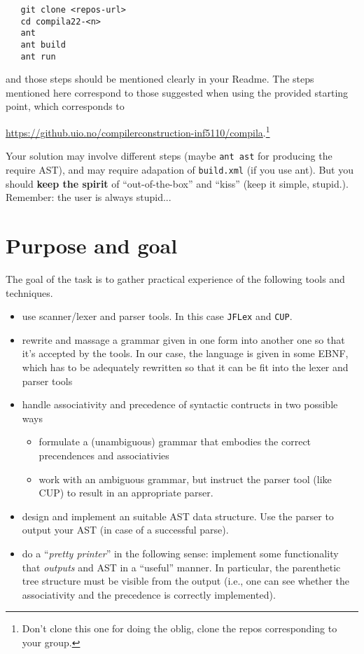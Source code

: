 \documentclass[10pt,freeform]{handout}[2014/08/13]
\begin{document}
\begin{verbatim}
   git clone <repos-url>
   cd compila22-<n>
   ant
   ant build
   ant run
\end{verbatim}
and those steps should be mentioned clearly in your Readme. The steps
mentioned here correspond to those suggested when using the provided
starting point, which corresponds to
\begin{center}
  \url{https://github.uio.no/compilerconstruction-inf5110/compila}.\footnote{Don't
    clone this one for doing the oblig, clone the repos corresponding to
    your group.}
\end{center}
Your solution may involve different steps (maybe \texttt{ant ast} for
producing the require AST), and may require adapation of \texttt{build.xml}
(if you use ant). But you should \textbf{keep the spirit} of
``out-of-the-box'' and ``kiss'' (keep it simple, stupid.). Remember: the
user is always stupid...





\section{Purpose and goal}
\label{sec:x}

The goal of the task is to gather practical experience of the following
tools and techniques.
\begin{itemize}
\item use scanner/lexer and parser tools. In this case \texttt{JFLex} and
  \texttt{CUP}.
\item rewrite and massage a grammar given in one form into another one so
  that it's accepted by the tools. In our case, the language is given in
  some EBNF, which has to be adequately rewritten so that it can be fit
  into the lexer and parser tools
\item handle associativity and precedence of syntactic contructs in two
  possible ways
  \begin{itemize}
  \item formulate a (unambiguous) grammar that embodies the correct
    precendences and associativies
  \item work with an ambiguous grammar, but instruct the parser tool (like
    CUP) to result in an appropriate parser.
  \end{itemize}
\item design and implement an suitable AST data structure.  Use the parser
  to output your AST (in case of a successful parse).
\item do a ``\emph{pretty printer}'' in the following sense: implement some
  functionality that \emph{outputs} and AST in a ``useful'' manner. In
  particular, the parenthetic tree structure must be visible from the
  output (i.e., one can see whether the associativity and the precedence is
  correctly implemented). 
\end{itemize}
\end{document}
